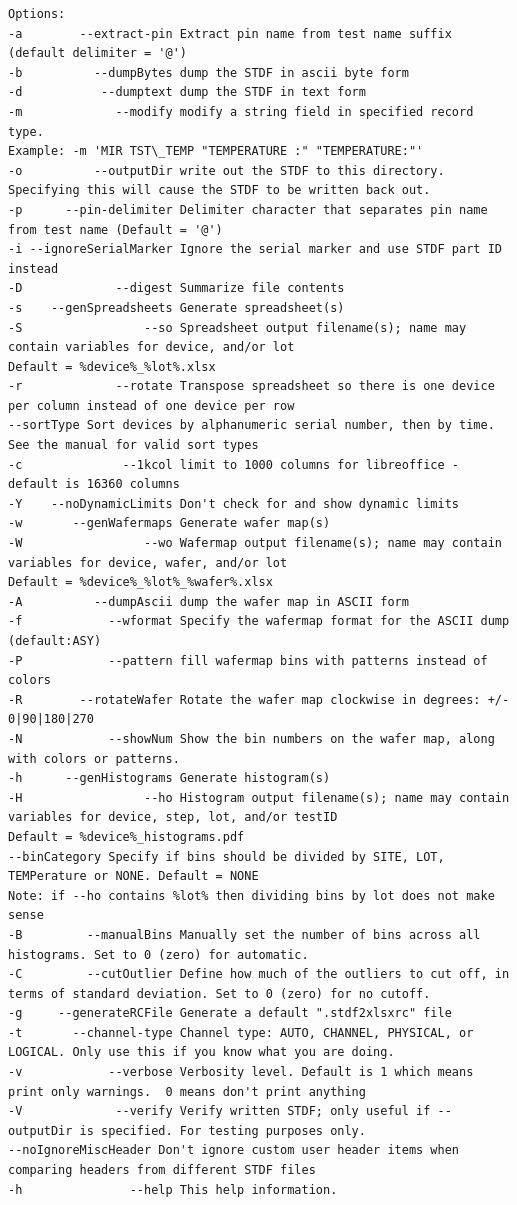 \documentclass[letterpaper]{article}
\begin{document}
\begin{verbatim}
Options:
-a        --extract-pin Extract pin name from test name suffix (default delimiter = '@')
-b          --dumpBytes dump the STDF in ascii byte form
-d           --dumptext dump the STDF in text form
-m             --modify modify a string field in specified record type.
Example: -m 'MIR TST\_TEMP "TEMPERATURE :" "TEMPERATURE:"'
-o          --outputDir write out the STDF to this directory. Specifying this will cause the STDF to be written back out.
-p      --pin-delimiter Delimiter character that separates pin name from test name (Default = '@')
-i --ignoreSerialMarker Ignore the serial marker and use STDF part ID instead
-D             --digest Summarize file contents
-s    --genSpreadsheets Generate spreadsheet(s)
-S                 --so Spreadsheet output filename(s); name may contain variables for device, and/or lot
Default = %device%_%lot%.xlsx
-r             --rotate Transpose spreadsheet so there is one device per column instead of one device per row
--sortType Sort devices by alphanumeric serial number, then by time. See the manual for valid sort types
-c              --1kcol limit to 1000 columns for libreoffice - default is 16360 columns
-Y    --noDynamicLimits Don't check for and show dynamic limits
-w       --genWafermaps Generate wafer map(s)
-W                 --wo Wafermap output filename(s); name may contain variables for device, wafer, and/or lot
Default = %device%_%lot%_%wafer%.xlsx
-A          --dumpAscii dump the wafer map in ASCII form
-f            --wformat Specify the wafermap format for the ASCII dump (default:ASY)
-P            --pattern fill wafermap bins with patterns instead of colors
-R        --rotateWafer Rotate the wafer map clockwise in degrees: +/- 0|90|180|270
-N            --showNum Show the bin numbers on the wafer map, along with colors or patterns.
-h      --genHistograms Generate histogram(s)
-H                 --ho Histogram output filename(s); name may contain variables for device, step, lot, and/or testID
Default = %device%_histograms.pdf
--binCategory Specify if bins should be divided by SITE, LOT, TEMPerature or NONE. Default = NONE
Note: if --ho contains %lot% then dividing bins by lot does not make sense
-B         --manualBins Manually set the number of bins across all histograms. Set to 0 (zero) for automatic.
-C         --cutOutlier Define how much of the outliers to cut off, in terms of standard deviation. Set to 0 (zero) for no cutoff.
-g     --generateRCFile Generate a default ".stdf2xlsxrc" file
-t       --channel-type Channel type: AUTO, CHANNEL, PHYSICAL, or LOGICAL. Only use this if you know what you are doing.
-v            --verbose Verbosity level. Default is 1 which means print only warnings.  0 means don't print anything
-V             --verify Verify written STDF; only useful if --outputDir is specified. For testing purposes only.
--noIgnoreMiscHeader Don't ignore custom user header items when comparing headers from different STDF files
-h               --help This help information.
\end{verbatim}
\endgroup
\end{document}
